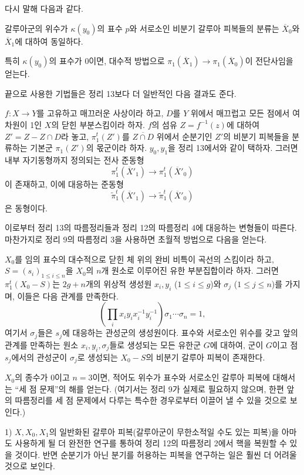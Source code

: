 다시 말해 다음과 같다.

 갈루아군의 위수가 $\kappa(y_0)$의 표수 $p$와
서로소인 비분기 갈루아 피복들의 분류는 $\overline X_0$와
$\overline X_1$에 대하여 동일하다.

특히 $\kappa(y_0)$의 표수가 0이면, 대수적 방법으로
$\pi_1(\overline X_1)\longrightarrow\pi_1(\overline X_0)$이
전단사임을 얻는다.

끝으로 사용한 기법들은 정리 13보다 더 일반적인 다음 결과도 준다.

 $f:X\longrightarrow Y$를 고유하고 매끄러운 사상이라
하고, $D$를 $Y$ 위에서 매끄럽고 모든 점에서 여차원이 1인 $X$의 닫힌
부분스킴이라 하자. $f$의 섬유 $Z=f^{-1}(z)$에 대하여
$Z'=Z-Z\cap D$라 놓고, $\pi_1^t(Z')$를 $\overline{Z\cap D}$ 위에서
순분기인 $Z'$의 비분기 피복들을 분류하는 기본군 $\pi_1(Z')$의 몫군이라
하자. $y_0,y_1$을 정리 13에서와 같이 택하자. 그러면 내부 자기동형까지
정의되는 전사 준동형
\[
  \pi_1^t(\overline X'_1)\longrightarrow\pi_1^t(\overline X'_0)
\]
이 존재하고, 이에 대응하는 준동형
\[
  \widetilde\pi_1^t(\overline X'_1)
  \longrightarrow\widetilde\pi_1^t(\overline X'_0)
\]
은 동형이다.

이로부터 정리 13의 따름정리들과 정리 12의 따름정리 4에 대응하는
변형들이 따른다. 마찬가지로 정리 9의 따름정리 3을 사용하면 초월적
방법으로 다음을 얻는다.

 $X_0$를 임의 표수의 대수적으로 닫힌 체 위의 완비
비특이 곡선의 스킴이라 하고,
$S=(s_i)_{1\le i\le n}$을 $X_0$의 $n$개 원소로 이루어진 유한
부분집합이라 하자. 그러면 $\pi_1^t(X_0-S)$는 $2g+n$개의 위상적 생성원
$x_i,y_i$ ($1\le i\le g$)와 $\sigma_j$ ($1\le j\le n$)를 가지며,
이들은 다음 관계를 만족한다.
\[
  \left(\prod_i x_i y_i x_i^{-1}y_i^{-1}\right)
  \sigma_1\cdots\sigma_n=1,
\]
여기서 $\sigma_j$들은 $s_j$에 대응하는 관성군의 생성원이다. 표수와
서로소인 위수를 갖고 앞의 관계를 만족하는 원소
$x_i,y_i,\sigma_j$들로 생성되는 모든 유한군 $G$에 대하여, 군이
$G$이고 점 $s_j$에서의 관성군이 $\sigma_j$로 생성되는
$X_0-S$의 비분기 갈루아 피복이 존재한다.

$X_0$의 종수가 0이고 $n=3$이면, 적어도 위수가 표수와 서로소인 갈루아
피복에 대해서는 ``세 점 문제''의 해를 얻는다. (여기서는 정리 9가
실제로 필요하지 않으며, 한편 앞의 따름정리를 세 점 문제에서 다루는
특수한 경우로부터 이끌어 낼 수 있을 것으로 보인다.)


1) $X,X_0,X_1$의 일반화된 갈루아 피복(갈루아군이 무한소적일 수도
있는 피복)을 아마도 사용하게 될 더 완전한 연구를 통하여 정리 12의
따름정리 2에서 핵을 복원할 수 있을 것이다. 반면 순분기가 아닌 분기를
허용하는 피복을 연구하는 일은 훨씬 더 어려울 것으로 보인다.

